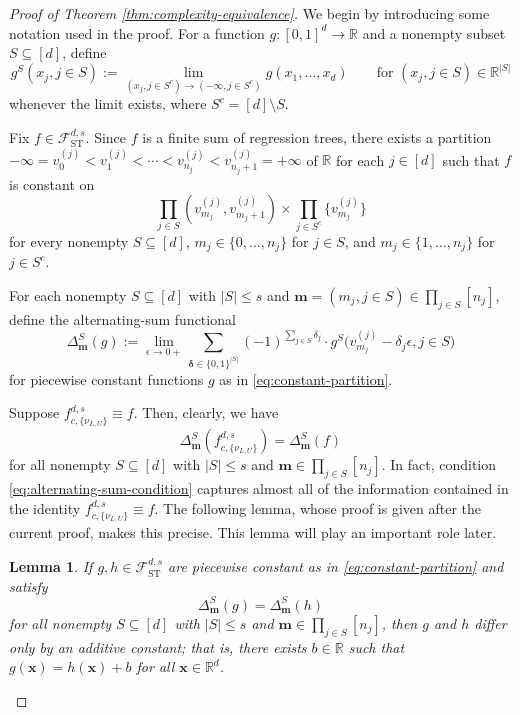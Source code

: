 \documentclass[10pt]{article}
\newtheorem{lemma}{Lemma}
\newcommand{\R}{{\mathbb R}}
\newcommand{\fst}{{\mathcal{F}^{d, s}_{\text{ST}}}}
\newcommand{\fcnu}{{f^{d, s}_{c, \{\nu_{L, U}\}}}}
\newcommand{\xbf}{{\mathbf{x}}}
\newcommand{\mbf}{{\mathbf{m}}}
\newcommand{\deltabf}{{\boldsymbol{\delta}}}
\begin{document}
\begin{proof}[Proof of Theorem \ref{thm:complexity-equivalence}]
We begin by introducing some notation used in the proof. For a function 
$g:[0, 1]^d \to \R$ and a nonempty subset $S \subseteq [d]$, define
\begin{equation*}
    g^S(x_j, j \in S) 
    := \lim_{(x_j, j \in S^c) \to (-\infty, j \in S^c)} 
    g(x_1, \dots, x_d) 
    \qquad \text{for } (x_j, j \in S) \in \R^{|S|}
\end{equation*}
whenever the limit exists, where $S^c = [d] \setminus S$.
    
Fix $f \in \fst$. 
Since $f$ is a finite sum of regression trees, there exists a 
partition $-\infty = v^{(j)}_0 < v^{(j)}_1 < \cdots < v^{(j)}_{n_j} 
< v^{(j)}_{n_j + 1} = +\infty$ of $\R$ for each $j \in [d]$ such that
$f$ is constant on 
\begin{equation}\label{eq:constant-partition}
    \prod_{j \in S} (v^{(j)}_{m_j}, v^{(j)}_{m_j + 1}) 
    \times \prod_{j \in S^c} \{v^{(j)}_{m_j}\}
\end{equation}
for every nonempty $S \subseteq [d]$, 
$m_j \in \{0, \dots, n_j\}$ for $j \in S$, and 
$m_j \in \{1, \dots, n_j\}$ for $j \in S^c$.
    
For each nonempty $S \subseteq [d]$ with $|S| \le s$ and
$\mbf = (m_j, j \in S) \in \prod_{j \in S} [n_j]$, define the 
alternating-sum functional 
\begin{equation*}
    \Delta^S_{\mbf}(g) 
    := \lim_{\epsilon \to 0+} \sum_{\deltabf \in \{0, 1\}^{|S|}}
    (-1)^{\sum_{j \in S} \delta_j} \cdot
    g^S(v^{(j)}_{m_j} - \delta_j \epsilon, j \in S\big)
\end{equation*}
for piecewise constant functions $g$ as in \eqref{eq:constant-partition}. 
    
Suppose $\fcnu \equiv f$. Then, clearly, we have
\begin{equation}\label{eq:alternating-sum-condition}
    \Delta^S_{\mbf}(\fcnu) = \Delta^S_{\mbf}(f)
\end{equation}
for all nonempty $S \subseteq [d]$ with $|S| \le s$ and 
$\mbf \in \prod_{j \in S} [n_j]$.
In fact, condition \eqref{eq:alternating-sum-condition} captures almost 
all of the information contained in the identity $\fcnu \equiv f$. The 
following lemma, whose proof is given after the current proof, makes this 
precise. This lemma will play an important role later.
\begin{lemma}\label{lem:alternating-sum-condition-equivalence}
    If $g, h \in \fst$ are piecewise constant as in 
    \eqref{eq:constant-partition} and satisfy
    \begin{equation*}
        \Delta^S_{\mbf}(g) 
        = \Delta^S_{\mbf}(h)
    \end{equation*}
    for all nonempty $S \subseteq [d]$ with $|S| \le s$ and
    $\mbf \in \prod_{j \in S} [n_j]$, then $g$ and $h$ differ 
    only by an additive constant; that is, there exists $b \in \R$ such that 
    $g(\xbf) = h(\xbf) + b$ for all $\xbf \in \R^d$.
\end{lemma}
    

\end{proof}
\end{document}
